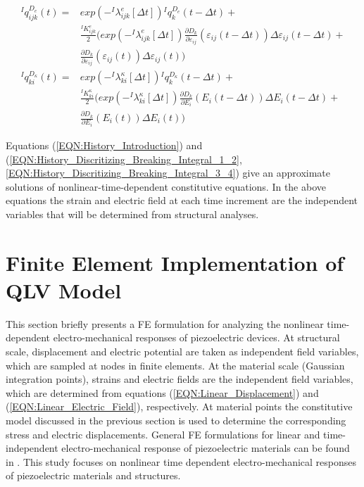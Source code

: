 \begin{equation}
\begin{aligned}
{}^{I}q_{ijk}^{D_e}(t)=&
exp(-{}^{I}\lambda_{ijk}^{e}[\Delta t]){}^{I}q_{k}^{D_e}(t-\Delta t)+\\
& \frac{{}^{I}K_{ijk}^{e}}{2} \Big(exp(-{}^{I}\lambda_{ijk}^{e}[\Delta t]) \frac{\partial D_{k}}{\partial \varepsilon_{ij}}( \varepsilon_{ij}(t-\Delta t)) \Delta \varepsilon_{ij}(t-\Delta t) + \\
& \frac{\partial D_{k}}{\partial \varepsilon_{ij}}(\varepsilon_{ij}(t)) \Delta \varepsilon_{ij}(t)\Big) \\
{}^{I}q_{ki}^{D_{\kappa}}(t)=&
exp(-{}^{I}\lambda_{ki}^{\kappa}[\Delta t]){}^{I}q_{k}^{D_{\kappa}}(t-\Delta t)+\\
& \frac{{}^{I} K_{ki}^{\kappa}}{2} \Big( exp(-{}^{I}\lambda_{ki}^{\kappa}[\Delta t]) \frac{\partial D_{k}}{\partial E_{i}}( E_{i} (t-\Delta t)) \Delta E_{i} (t-\Delta t) + \\ 
& \frac{\partial D_{k}}{\partial E_{i}}( E_{i} (t)) \Delta E_{i} (t)\Big)
\end{aligned}
\label{EQN:History_Discritizing_Breaking_Integral_3_4}
\end{equation}

Equations (\ref{EQN:History_Introduction}) and (\ref{EQN:History_Discritizing_Breaking_Integral_1_2}, \ref{EQN:History_Discritizing_Breaking_Integral_3_4}) give an approximate solutions of nonlinear-time-dependent constitutive equations. 
In the above equations the strain and electric field at each time increment are the independent variables that will be determined from structural analyses.

\section{Finite Element Implementation of QLV Model}
\label{Chapter:Finite_element}
This section briefly presents a FE formulation for analyzing the nonlinear time-dependent electro-mechanical responses of piezoelectric devices. 
At structural scale, displacement and electric potential are taken as independent field variables, which are sampled at nodes in finite elements. 
At the material scale (Gaussian integration points), strains and electric fields are the independent field variables, which are determined from equations (\ref{EQN:Linear_Displacement}) and (\ref{EQN:Linear_Electric_Field}), respectively.
At material points the constitutive model discussed in the previous section is used to determine the corresponding stress and electric displacements. 
General FE formulations for linear and time-independent electro-mechanical response of piezoelectric materials can be found in \cite{Benjeddou2000}.
This study focuses on nonlinear time dependent electro-mechanical responses of piezoelectric materials and structures. 

